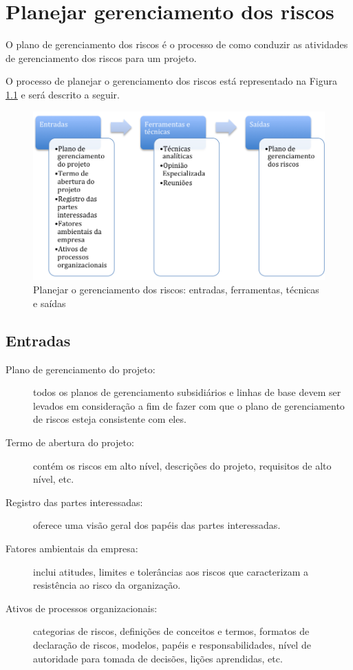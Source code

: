 \chapter{Planejar gerenciamento dos riscos}

O plano de gerenciamento dos riscos é o processo de como conduzir as atividades de gerenciamento dos riscos para um projeto.

O processo de planejar o gerenciamento dos riscos está representado na Figura \ref{fig:riscos:plan:efts} e será descrito a seguir.

\begin{figure}[!h]
	\centering
	\includegraphics[scale=0.5]{Figuras/riscos_efts_planejar.png}
	\caption{Planejar o gerenciamento dos riscos: entradas, ferramentas, técnicas e saídas}
	\label{fig:riscos:plan:efts}
\end{figure}

\section{Entradas}

\begin{description}
	
	\item[Plano de gerenciamento do projeto:] todos os planos de gerenciamento subsidiários e linhas de base devem ser levados em consideração a fim de fazer com que o plano de gerenciamento de riscos esteja consistente com eles.
	
	\item[Termo de abertura do projeto:] contém os riscos em alto nível, descrições do projeto, requisitos de alto nível, etc.
	
	\item[Registro das partes interessadas:] oferece uma visão geral dos papéis das partes interessadas.
	
	\item[Fatores ambientais da empresa:] inclui atitudes, limites e tolerâncias aos riscos que caracterizam a resistência ao risco da organização.
	
	\item[Ativos de processos organizacionais:] categorias de riscos, definições de conceitos e termos, formatos de declaração de riscos, modelos, papéis e responsabilidades, nível de autoridade para tomada de decisões, lições aprendidas, etc.

\end{description}

